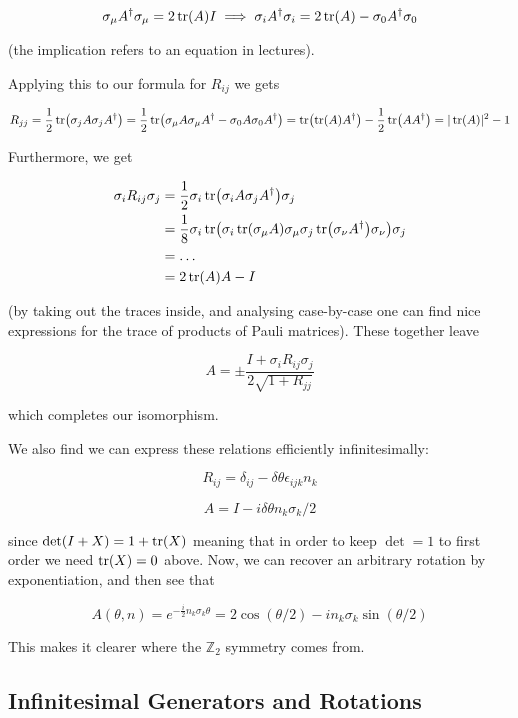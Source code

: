 \documentclass{article}
\theoremstyle{definition}
\begin{document}
$$ \sigma_\mu A^\dagger \sigma_\mu = 2 \tr(A) I \implies \sigma_i A^\dagger
\sigma_i = 2 \tr(A) - \sigma_0 A^\dagger \sigma_0 $$

(the implication refers to an equation in lectures).

Applying this to our formula for $R_{ij}$ we gets

$$ R_{jj} = \frac{1}{2} \tr(\sigma_j A \sigma_j A^\dagger) = \frac{1}{2}
\tr(\sigma_\mu A \sigma_\mu A^\dagger - \sigma_0 A \sigma_0 A^\dagger) =
\tr(\tr(A) A^\dagger) - \frac{1}{2} \tr(AA^\dagger) = |\tr(A)|^2 - 1 $$

Furthermore, we get

\begin{align*}
\sigma_i R_{ij} \sigma_j
&= \frac{1}{2} \sigma_i \tr(\sigma_i A \sigma_j A^\dagger) \sigma_j \\
&= \frac{1}{8} \sigma_i \tr(\sigma_i \tr(\sigma_\mu A) \sigma_\mu \sigma_j \tr(\sigma_\nu A^\dagger) \sigma_\nu) \sigma_j \\
&= \dots \\
&= 2\tr(A)A - I
\end{align*}

(by taking out the traces inside, and analysing case-by-case one can find nice
expressions for the trace of products of Pauli matrices). These together leave

$$ A = \pm \frac{I + \sigma_i R_{ij} \sigma_j}{2\sqrt{1 + R_{jj}}} $$

which completes our isomorphism.

We also find we can express these relations efficiently infinitesimally:

$$ R_{ij} = \delta_{ij} - \delta \theta \epsilon_{ijk} n_k $$

$$ A = I - i \delta \theta n_k \sigma_k / 2 $$

since $\det(I + X) = 1 + \tr(X)$ meaning that in order to keep $\det = 1$ to
first order we need $\tr(X) = 0$ above. Now, we can recover an arbitrary
rotation by exponentiation, and then see that

$$ A(\theta, n) = e^{-\frac{i}{2} n_k \sigma_k \theta} = 2 \cos(\theta / 2) - i
  n_k \sigma_k \sin(\theta / 2) $$

This makes it clearer where the $\mathbb{Z}_2$ symmetry comes from.

\subsection{Infinitesimal Generators and Rotations}
\end{document}
